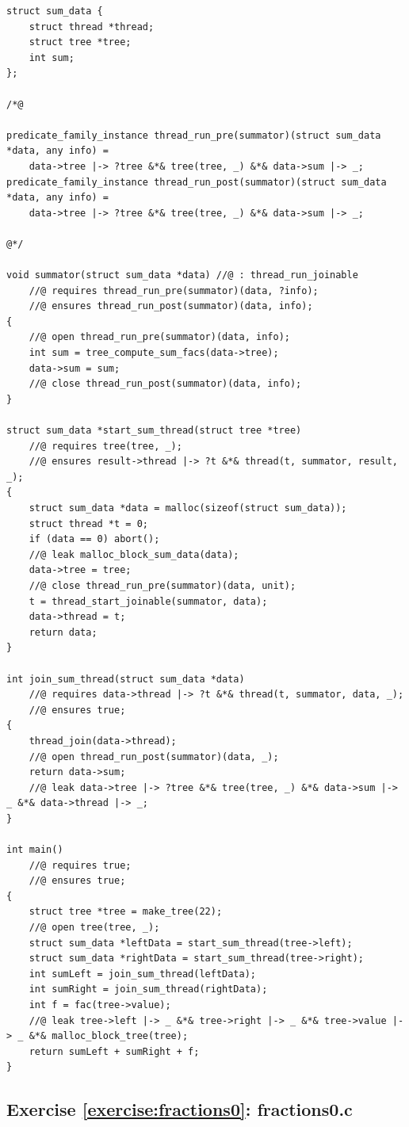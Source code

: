 \documentclass{article}
\begin{document}
\begin{lstlisting}
struct sum_data {
    struct thread *thread;
    struct tree *tree;
    int sum;
};

/*@

predicate_family_instance thread_run_pre(summator)(struct sum_data *data, any info) =
    data->tree |-> ?tree &*& tree(tree, _) &*& data->sum |-> _;
predicate_family_instance thread_run_post(summator)(struct sum_data *data, any info) =
    data->tree |-> ?tree &*& tree(tree, _) &*& data->sum |-> _;

@*/

void summator(struct sum_data *data) //@ : thread_run_joinable
    //@ requires thread_run_pre(summator)(data, ?info);
    //@ ensures thread_run_post(summator)(data, info);
{
    //@ open thread_run_pre(summator)(data, info);
    int sum = tree_compute_sum_facs(data->tree);
    data->sum = sum;
    //@ close thread_run_post(summator)(data, info);
}

struct sum_data *start_sum_thread(struct tree *tree)
    //@ requires tree(tree, _);
    //@ ensures result->thread |-> ?t &*& thread(t, summator, result, _);
{
    struct sum_data *data = malloc(sizeof(struct sum_data));
    struct thread *t = 0;
    if (data == 0) abort();
    //@ leak malloc_block_sum_data(data);
    data->tree = tree;
    //@ close thread_run_pre(summator)(data, unit);
    t = thread_start_joinable(summator, data);
    data->thread = t;
    return data;
}

int join_sum_thread(struct sum_data *data)
    //@ requires data->thread |-> ?t &*& thread(t, summator, data, _);
    //@ ensures true;
{
    thread_join(data->thread);
    //@ open thread_run_post(summator)(data, _);
    return data->sum;
    //@ leak data->tree |-> ?tree &*& tree(tree, _) &*& data->sum |-> _ &*& data->thread |-> _;
}

int main()
    //@ requires true;
    //@ ensures true;
{
    struct tree *tree = make_tree(22);
    //@ open tree(tree, _);
    struct sum_data *leftData = start_sum_thread(tree->left);
    struct sum_data *rightData = start_sum_thread(tree->right);
    int sumLeft = join_sum_thread(leftData);
    int sumRight = join_sum_thread(rightData);
    int f = fac(tree->value);
    //@ leak tree->left |-> _ &*& tree->right |-> _ &*& tree->value |-> _ &*& malloc_block_tree(tree);
    return sumLeft + sumRight + f;
}
\end{lstlisting}

\subsection{Exercise \ref{exercise:fractions0}: fractions0.c}\label{solution:fractions0}
\end{document}
